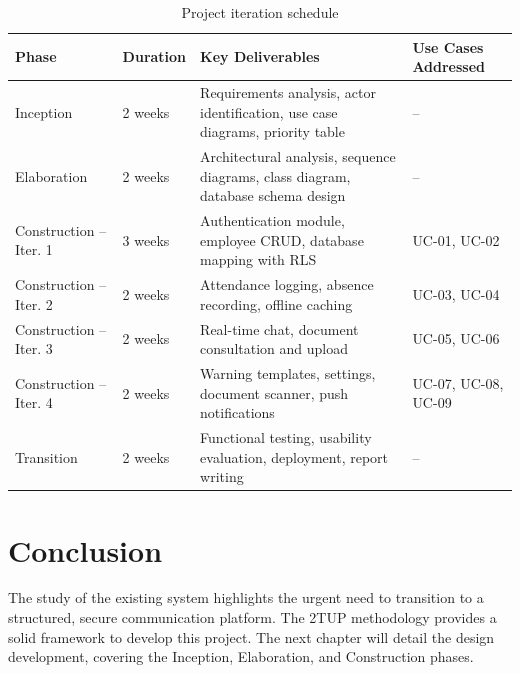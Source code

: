 \begin{table}[H]
\centering
\caption{Project iteration schedule}
\label{tab:iteration_schedule}
\begin{tabular}{|l|l|p{5cm}|p{4cm}|}
\hline
\textbf{Phase} & \textbf{Duration} & \textbf{Key Deliverables} & \textbf{Use Cases Addressed} \\
\hline
Inception & 2 weeks & Requirements analysis, actor identification, use case diagrams, priority table & -- \\
\hline
Elaboration & 2 weeks & Architectural analysis, sequence diagrams, class diagram, database schema design & -- \\
\hline
Construction -- Iter. 1 & 3 weeks & Authentication module, employee CRUD, database mapping with RLS & UC-01, UC-02 \\
\hline
Construction -- Iter. 2 & 2 weeks & Attendance logging, absence recording, offline caching & UC-03, UC-04 \\
\hline
Construction -- Iter. 3 & 2 weeks & Real-time chat, document consultation and upload & UC-05, UC-06 \\
\hline
Construction -- Iter. 4 & 2 weeks & Warning templates, settings, document scanner, push notifications & UC-07, UC-08, UC-09 \\
\hline
Transition & 2 weeks & Functional testing, usability evaluation, deployment, report writing & -- \\
\hline
\end{tabular}
\end{table}


\section{Conclusion}
The study of the existing system highlights the urgent need to transition to a structured, secure communication platform. The 2TUP methodology provides a solid framework to develop this project. The next chapter will detail the design development, covering the Inception, Elaboration, and Construction phases.
